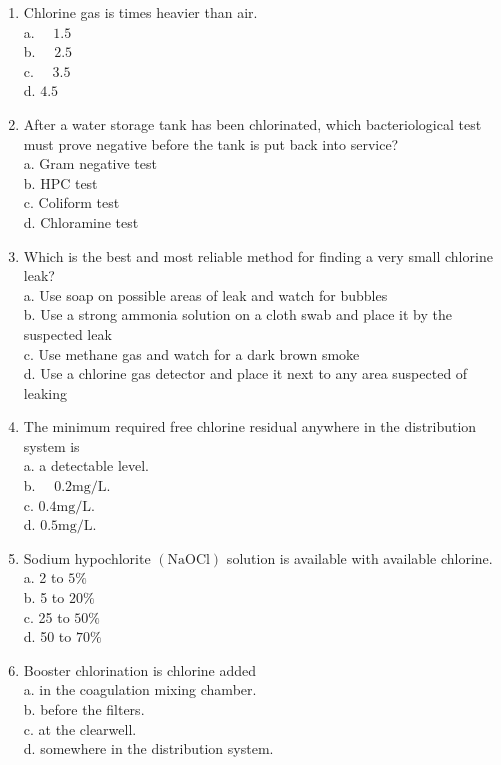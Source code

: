 \documentclass[10pt]{article}
\begin{document}
\begin{enumerate}
  \item Chlorine gas is times heavier than air.\\
a. $\quad 1.5$\\
b. $\quad 2.5$\\
c. $\quad 3.5$\\
d. $4.5$ 

	\item After a water storage tank has been chlorinated, which bacteriological test must prove negative before the tank is put back into service?\\
a. Gram negative test\\
b. HPC test\\
c. Coliform test\\
d. Chloramine test

  \item Which is the best and most reliable method for finding a very small chlorine leak?\\
a. Use soap on possible areas of leak and watch for bubbles\\
b. Use a strong ammonia solution on a cloth swab and place it by the suspected leak\\
c. Use methane gas and watch for a dark brown smoke\\
d. Use a chlorine gas detector and place it next to any area suspected of leaking

  \item The minimum required free chlorine residual anywhere in the distribution system is\\
a. a detectable level.\\
b. $\quad 0.2 \mathrm{mg} / \mathrm{L}$.\\
c. $0.4 \mathrm{mg} / \mathrm{L}$.\\
d. $0.5 \mathrm{mg} / \mathrm{L}$.

  \item Sodium hypochlorite $(\mathrm{NaOCl})$ solution is available with available chlorine.\\
a. 2 to $5 \%$\\
b. 5 to $20 \%$\\
c. 25 to $50 \%$\\
d. 50 to $70 \%$

  \item Booster chlorination is chlorine added\\
a. in the coagulation mixing chamber.\\
b. before the filters.\\
c. at the clearwell.\\
d. somewhere in the distribution system.


\end{enumerate}
\end{document}
